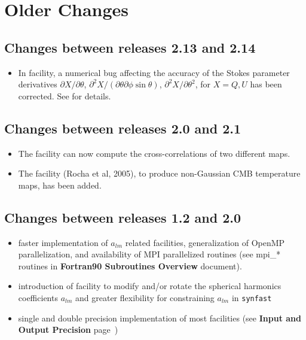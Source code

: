 \documentclass[12pt,twoside]{article}
\begin{document}
{\footnotesize{%
\section[Older Changes]{Older Changes}
\subsection[Changes between releases 2.13 and 2.14]{Changes between releases 2.13 and
2.14}
\begin{itemize}
\item In  facility, a numerical bug affecting the accuracy of the Stokes parameter derivatives 
$\partial X/\partial\theta$, 
$\partial^2 X/(\partial\theta\partial\phi\sin\theta)$, 
$\partial^2 X/\partial \theta^2$, 
for $X=Q,U$ has been corrected. See  for details.
\end{itemize}

\subsection[Changes between releases 2.0 and 2.1]{Changes between releases 2.0 and
2.1}
\begin{itemize}
\item The  facility can now compute the cross-correlations of two different
maps. 
\item The  facility (Rocha et al, 2005), to produce non-Gaussian CMB temperature maps,
has been added.
\end{itemize}

\subsection[Changes between releases 1.2 and 2.0]{Changes between releases 1.2 and 2.0}
\begin{itemize}
\item faster implementation of $a_{lm}$ related facilities, generalization of
  OpenMP parallelization, and availability of MPI parallelized routines (see
  mpi\_* routines in {\bf Fortran90 Subroutines Overview} document).
\item introduction of  facility to modify and/or rotate the spherical
  harmonics coefficients $a_{lm}$ and greater flexibility for constraining
  $a_{lm}$ in {\tt synfast}
\item single and double precision implementation of most facilities (see {\bf {Input and Output Precision}}
  page~\pageref{page:ioprec})
\end{itemize}
}}%
\end{document}
